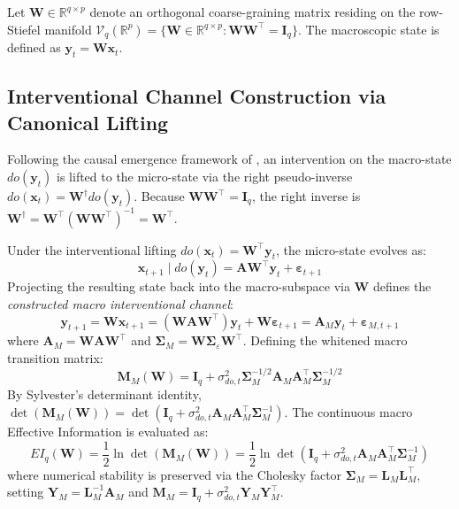 \documentclass[12pt]{article}
\begin{document}
Let $\mathbf{W} \in \mathbb{R}^{q \times p}$ denote an orthogonal coarse-graining matrix residing on the row-Stiefel manifold $\mathcal{V}_q(\mathbb{R}^p) = \{ \mathbf{W} \in \mathbb{R}^{q \times p} : \mathbf{W}\mathbf{W}^\top = \mathbf{I}_q \}$. The macroscopic state is defined as $\mathbf{y}_t = \mathbf{W}\mathbf{x}_t$.

\subsection{Interventional Channel Construction via Canonical Lifting}
Following the causal emergence framework of \citet{liu2024exact}, an intervention on the macro-state $do(\mathbf{y}_t)$ is lifted to the micro-state via the right pseudo-inverse $do(\mathbf{x}_t) = \mathbf{W}^\dagger do(\mathbf{y}_t)$. Because $\mathbf{W}\mathbf{W}^\top = \mathbf{I}_q$, the right inverse is $\mathbf{W}^\dagger = \mathbf{W}^\top (\mathbf{W}\mathbf{W}^\top)^{-1} = \mathbf{W}^\top$.

Under the interventional lifting $do(\mathbf{x}_t) = \mathbf{W}^\top \mathbf{y}_t$, the micro-state evolves as:
\begin{equation}
\mathbf{x}_{t+1} \mid do(\mathbf{y}_t) = \mathbf{A} \mathbf{W}^\top \mathbf{y}_t + \boldsymbol{\varepsilon}_{t+1}
\end{equation}
Projecting the resulting state back into the macro-subspace via $\mathbf{W}$ defines the \emph{constructed macro interventional channel}:
\begin{equation}
\mathbf{y}_{t+1} = \mathbf{W}\mathbf{x}_{t+1} = (\mathbf{W}\mathbf{A}\mathbf{W}^\top)\mathbf{y}_t + \mathbf{W}\boldsymbol{\varepsilon}_{t+1} = \mathbf{A}_M \mathbf{y}_t + \boldsymbol{\varepsilon}_{M,t+1}
\end{equation}
where $\mathbf{A}_M = \mathbf{W}\mathbf{A}\mathbf{W}^\top$ and $\boldsymbol{\Sigma}_M = \mathbf{W}\boldsymbol{\Sigma}_\varepsilon \mathbf{W}^\top$. Defining the whitened macro transition matrix:
\begin{equation}
\mathbf{M}_M(\mathbf{W}) = \mathbf{I}_q + \sigma_{do,t}^2 \boldsymbol{\Sigma}_M^{-1/2} \mathbf{A}_M \mathbf{A}_M^\top \boldsymbol{\Sigma}_M^{-1/2}
\end{equation}
By Sylvester's determinant identity, $\det(\mathbf{M}_M(\mathbf{W})) = \det(\mathbf{I}_q + \sigma_{do,t}^2 \mathbf{A}_M \mathbf{A}_M^\top \boldsymbol{\Sigma}_M^{-1})$. The continuous macro Effective Information is evaluated as:
\begin{equation}
EI_q(\mathbf{W}) = \frac{1}{2} \ln \det \left( \mathbf{M}_M(\mathbf{W}) \right) = \frac{1}{2} \ln \det \left( \mathbf{I}_q + \sigma_{do,t}^2 \mathbf{A}_M \mathbf{A}_M^\top \boldsymbol{\Sigma}_M^{-1} \right)
\end{equation}
where numerical stability is preserved via the Cholesky factor $\boldsymbol{\Sigma}_M = \mathbf{L}_M \mathbf{L}_M^\top$, setting $\mathbf{Y}_M = \mathbf{L}_M^{-1}\mathbf{A}_M$ and $\mathbf{M}_M = \mathbf{I}_q + \sigma_{do,t}^2 \mathbf{Y}_M \mathbf{Y}_M^\top$.
\end{document}
